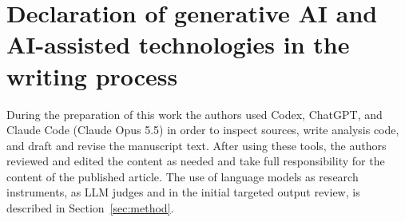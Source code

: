 \section*{Declaration of generative AI and AI-assisted technologies in the writing process}
During the preparation of this work the authors used Codex, ChatGPT, and Claude Code (Claude Opus 5.5) in order to inspect sources, write analysis code, and draft and revise the manuscript text. After using these tools, the authors reviewed and edited the content as needed and take full responsibility for the content of the published article. The use of language models as research instruments, as LLM judges and in the initial targeted output review, is described in Section~\ref{sec:method}.
